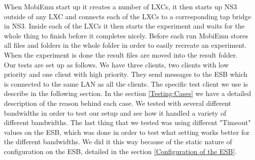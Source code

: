     When MobiEmu start up it creates a number of LXCs, it then starts up NS3 outside of any LXC and connects each of the LXCs to a corresponding tap bridge in NS3. Inside each of the LXCs it then starts the experiment and waits for the whole thing to finish before it completes nicely. Before each run MobiEmu stores all files and folders in the whole folder in order to easily recreate an experiment. When the experiment is done the result files are moved into the result folder. \\
    
    Our tests are set up as follows. We have three clients, two clients with low priority and one client with high priority. They send messages to the ESB which is connected to the same LAN as all the clients. The specific test client we use is describe in the following section. In the section \ref{Testing:Cases} we have a detailed description of the reason behind each case. We tested with several different bandwidths in order to test our setup and see how it handled a variety of different bandwidths. The last thing that we tested was using different "Timeout" values on the ESB, which was done in order to test what setting works better for the different bandwidths. We did it this way because of the static nature of configuration on the ESB, detailed in the section \ref{Configuration of the ESB}.
